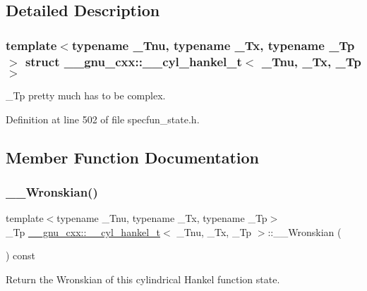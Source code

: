 \subsection{Detailed Description}
\subsubsection*{template$<$typename \+\_\+\+Tnu, typename \+\_\+\+Tx, typename \+\_\+\+Tp$>$\newline
struct \+\_\+\+\_\+gnu\+\_\+cxx\+::\+\_\+\+\_\+cyl\+\_\+hankel\+\_\+t$<$ \+\_\+\+Tnu, \+\_\+\+Tx, \+\_\+\+Tp $>$}

\+\_\+\+Tp pretty much has to be complex. 

Definition at line 502 of file specfun\+\_\+state.\+h.



\subsection{Member Function Documentation}
\mbox{\label{struct____gnu__cxx_1_1____cyl__hankel__t_a8a41c4698706cb51006f2d8ebb5d8053}} 
\subsubsection{\texorpdfstring{\+\_\+\+\_\+\+Wronskian()}{\_\_Wronskian()}}
{\footnotesize\ttfamily template$<$typename \+\_\+\+Tnu, typename \+\_\+\+Tx, typename \+\_\+\+Tp$>$ \\
\+\_\+\+Tp \hyperlink{struct____gnu__cxx_1_1____cyl__hankel__t}{\+\_\+\+\_\+gnu\+\_\+cxx\+::\+\_\+\+\_\+cyl\+\_\+hankel\+\_\+t}$<$ \+\_\+\+Tnu, \+\_\+\+Tx, \+\_\+\+Tp $>$\+::\+\_\+\+\_\+\+Wronskian (\begin{DoxyParamCaption}{ }\end{DoxyParamCaption}) const\hspace{0.3cm}{\ttfamily [inline]}}



Return the Wronskian of this cylindrical Hankel function state. 



